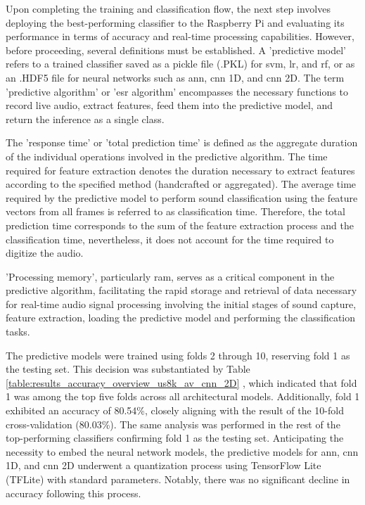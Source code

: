 Upon completing the training and classification flow, the next step involves deploying the best-performing classifier to the Raspberry Pi and evaluating its performance in terms of accuracy and real-time processing capabilities. However, before proceeding, several definitions must be established. A 'predictive model' refers to a trained classifier saved as a pickle file (.PKL) for \gls{svm}, \gls{lr}, and \gls{rf}, or as an .HDF5 file for neural networks such as \gls{ann}, \gls{cnn} 1D, and \gls{cnn} 2D. The term 'predictive algorithm' or '\gls{esr} algorithm' encompasses the necessary functions to record live audio, extract features, feed them into the predictive model, and return the inference as a single class.

The 'response time' or 'total prediction time' is defined as the aggregate duration of the individual operations involved in the predictive algorithm. The time required for feature extraction denotes the duration necessary to extract features according to the specified method (handcrafted or aggregated). The average time required by the predictive model to perform sound classification using the feature vectors from all frames is referred to as classification time. Therefore, the total prediction time corresponds to the sum of the feature extraction process and the classification time, nevertheless, it does not account for the time required to digitize the audio.

'Processing memory', particularly \gls{ram}, serves as a critical component in the predictive algorithm, facilitating the rapid storage and retrieval of data necessary for real-time audio signal processing involving the initial stages of sound capture, feature extraction, loading the predictive model and performing the classification tasks.

The predictive models were trained using folds 2 through 10, reserving fold 1 as the testing set. This decision was substantiated by Table \ref{table:results_accuracy_overview_us8k_av_cnn_2D} , which indicated that fold 1 was among the top five folds across all architectural models. Additionally, fold 1 exhibited an accuracy of 80.54\%, closely aligning with the result of the 10-fold cross-validation (80.03\%). The same analysis was performed in the rest of the top-performing classifiers confirming fold 1 as the testing set. Anticipating the necessity to embed the neural network models, the predictive models for \gls{ann}, \gls{cnn} 1D, and \gls{cnn} 2D underwent a quantization process using TensorFlow Lite (TFLite) with standard parameters. Notably, there was no significant decline in accuracy following this process.

